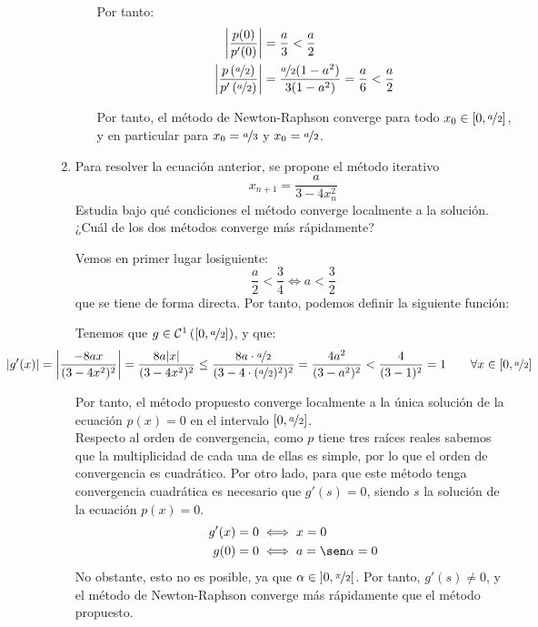 \begin{ejercicio}
\begin{enumerate}
\begin{enumerate}
            Por tanto:
            \begin{align*}
                \left|\dfrac{p(0)}{p'(0)}\right| &= \dfrac{a}{3}<\frac{a}{2}\\
                \left|\dfrac{p\left(\nicefrac{a}{2}\right)}{p'\left(\nicefrac{a}{2}\right)}\right| &= \dfrac{\nicefrac{a}{2}(1-a^2)}{3(1-a^2)} = \dfrac{a}{6}<\frac{a}{2}
            \end{align*}

            Por tanto, el método de Newton-Raphson converge para todo $x_0\in \left[0,\nicefrac{a}{2}\right]$, y en particular para $x_0 = \nicefrac{a}{3}$ y $x_0 = \nicefrac{a}{2}$.


        \end{enumerate}
        \item Para resolver la ecuación anterior, se propone el método iterativo
        \[
            x_{n+1} = \frac{a}{3- 4x_n^2}
        \]
        Estudia bajo qué condiciones el método converge localmente a la solución. ¿Cuál de los dos métodos converge más rápidamente?

        Vemos en primer lugar losiguiente:
        \begin{equation*}
            \frac{a}{2}<\frac{3}{4}\iff a<\frac{3}{2}
        \end{equation*}
        que se tiene de forma directa. Por tanto, podemos definir la siguiente función:

        Tenemos que $g\in \mathcal{C}^1\left(\left[0,\nicefrac{a}{2}\right]\right)$, y que:
        \begin{equation*}
            \hspace{-2cm}|g'(x)| = \left|\dfrac{-8ax}{(3-4x^2)^2}\right|
            = \dfrac{8a|x|}{(3-4x^2)^2}\leq \dfrac{8a\cdot \nicefrac{a}{2}}{(3-4\cdot (\nicefrac{a}{2})^2)^2} = \dfrac{4a^2}{(3-a^2)^2}<\dfrac{4}{(3-1)^2}=1\qquad \forall x\in \left[0,\nicefrac{a}{2}\right]
        \end{equation*}

        Por tanto, el método propuesto converge localmente a la única solución de la ecuación $p(x) = 0$ en el intervalo $\left[0,\nicefrac{a}{2}\right]$.\\

        Respecto al orden de convergencia, como $p$ tiene tres raíces reales sabemos que la multiplicidad de cada una de ellas es simple, por lo que el orden de convergencia es cuadrático. Por otro lado, para que este método tenga convergencia cuadrática es necesario que $g'(s)=0$, siendo $s$ la solución de la ecuación $p(x)=0$.
        \begin{align*}
            g'(x)=0&\iff x=0\\
            g(0)= 0&\iff a=\sen\alpha=0
        \end{align*}
        No obstante, esto no es posible, ya que $\alpha\in \left]0,\nicefrac{\pi}{2}\right[$. Por tanto, $g'(s)\neq 0$, y el método de Newton-Raphson converge más rápidamente que el método propuesto.


\end{enumerate}
\end{ejercicio}
